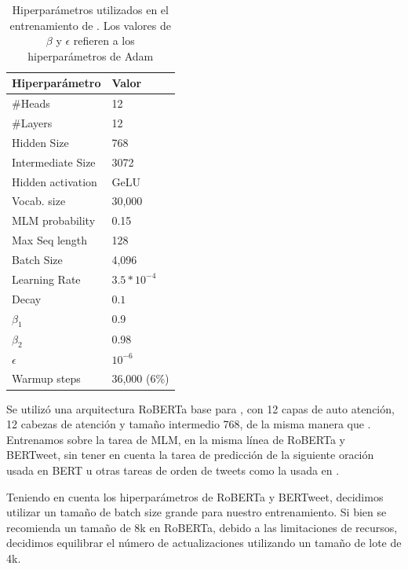 \begin{table}[t]
    \centering
    \large
    \begin{tabular}{l|l}
        \hline
        Hiperparámetro    & Valor \\
        \hline
        \#Heads           & 12             \\
        \#Layers          & 12             \\
        Hidden Size       & 768            \\
        Intermediate Size & 3072           \\
        Hidden activation & GeLU           \\
        Vocab. size       & 30,000         \\
        \hline
        MLM probability   & 0.15           \\
        Max Seq length    & 128            \\
        Batch Size        & 4,096          \\
        Learning Rate     & $3.5 * 10^{-4}$\\
        Decay             & $0.1$          \\
        $\beta_1$         & 0.9            \\
        $\beta_2$         & 0.98           \\
        $\epsilon$        & $10^{-6}$      \\
        Warmup steps      & 36,000 (6\%)   \\
        \hline
    \end{tabular}
    \caption{Hiperparámetros utilizados en el entrenamiento de \robertuito{}. Los valores de $\beta$ y $\epsilon$ refieren a los hiperparámetros de Adam}
    \label{tab:robertuito_architecture}
\end{table}

Se utilizó una arquitectura RoBERTa base para \robertuito{}, con 12 capas de auto atención, 12 cabezas de atención y tamaño intermedio 768, de la misma manera que \bertweet{}. Entrenamos sobre la tarea de MLM, en la misma línea de RoBERTa y BERTweet, sin tener en cuenta la tarea de predicción de la siguiente oración usada en BERT u otras tareas de orden de tweets como la usada en \citet{gonzalez2021twilbert}.

Teniendo en cuenta los hiperparámetros de RoBERTa y BERTweet, decidimos utilizar un tamaño de batch size grande para nuestro entrenamiento. Si bien se recomienda un tamaño de 8k en RoBERTa, debido a las limitaciones de recursos, decidimos equilibrar el número de actualizaciones utilizando un tamaño de lote de 4k.


